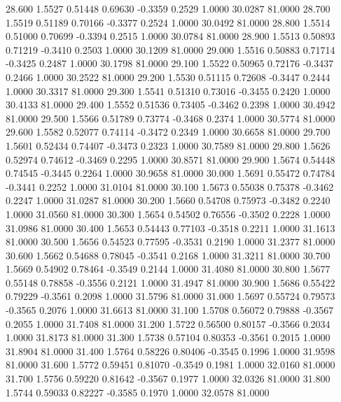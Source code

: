   28.600   1.5527   0.51448   0.69630  -0.3359   0.2529   1.0000  30.0287  81.0000
  28.700   1.5519   0.51189   0.70166  -0.3377   0.2524   1.0000  30.0492  81.0000
  28.800   1.5514   0.51000   0.70699  -0.3394   0.2515   1.0000  30.0784  81.0000
  28.900   1.5513   0.50893   0.71219  -0.3410   0.2503   1.0000  30.1209  81.0000
  29.000   1.5516   0.50883   0.71714  -0.3425   0.2487   1.0000  30.1798  81.0000
  29.100   1.5522   0.50965   0.72176  -0.3437   0.2466   1.0000  30.2522  81.0000
  29.200   1.5530   0.51115   0.72608  -0.3447   0.2444   1.0000  30.3317  81.0000
  29.300   1.5541   0.51310   0.73016  -0.3455   0.2420   1.0000  30.4133  81.0000
  29.400   1.5552   0.51536   0.73405  -0.3462   0.2398   1.0000  30.4942  81.0000
  29.500   1.5566   0.51789   0.73774  -0.3468   0.2374   1.0000  30.5774  81.0000
  29.600   1.5582   0.52077   0.74114  -0.3472   0.2349   1.0000  30.6658  81.0000
  29.700   1.5601   0.52434   0.74407  -0.3473   0.2323   1.0000  30.7589  81.0000
  29.800   1.5626   0.52974   0.74612  -0.3469   0.2295   1.0000  30.8571  81.0000
  29.900   1.5674   0.54448   0.74545  -0.3445   0.2264   1.0000  30.9658  81.0000
  30.000   1.5691   0.55472   0.74784  -0.3441   0.2252   1.0000  31.0104  81.0000
  30.100   1.5673   0.55038   0.75378  -0.3462   0.2247   1.0000  31.0287  81.0000
  30.200   1.5660   0.54708   0.75973  -0.3482   0.2240   1.0000  31.0560  81.0000
  30.300   1.5654   0.54502   0.76556  -0.3502   0.2228   1.0000  31.0986  81.0000
  30.400   1.5653   0.54443   0.77103  -0.3518   0.2211   1.0000  31.1613  81.0000
  30.500   1.5656   0.54523   0.77595  -0.3531   0.2190   1.0000  31.2377  81.0000
  30.600   1.5662   0.54688   0.78045  -0.3541   0.2168   1.0000  31.3211  81.0000
  30.700   1.5669   0.54902   0.78464  -0.3549   0.2144   1.0000  31.4080  81.0000
  30.800   1.5677   0.55148   0.78858  -0.3556   0.2121   1.0000  31.4947  81.0000
  30.900   1.5686   0.55422   0.79229  -0.3561   0.2098   1.0000  31.5796  81.0000
  31.000   1.5697   0.55724   0.79573  -0.3565   0.2076   1.0000  31.6613  81.0000
  31.100   1.5708   0.56072   0.79888  -0.3567   0.2055   1.0000  31.7408  81.0000
  31.200   1.5722   0.56500   0.80157  -0.3566   0.2034   1.0000  31.8173  81.0000
  31.300   1.5738   0.57104   0.80353  -0.3561   0.2015   1.0000  31.8904  81.0000
  31.400   1.5764   0.58226   0.80406  -0.3545   0.1996   1.0000  31.9598  81.0000
  31.600   1.5772   0.59451   0.81070  -0.3549   0.1981   1.0000  32.0160  81.0000
  31.700   1.5756   0.59220   0.81642  -0.3567   0.1977   1.0000  32.0326  81.0000
  31.800   1.5744   0.59033   0.82227  -0.3585   0.1970   1.0000  32.0578  81.0000
